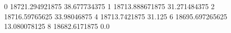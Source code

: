 0 18721.294921875 38.677734375
1 18713.888671875 31.271484375
2 18716.59765625 33.98046875
4 18713.7421875 31.125
6 18695.697265625 13.080078125
8 18682.6171875 0.0
